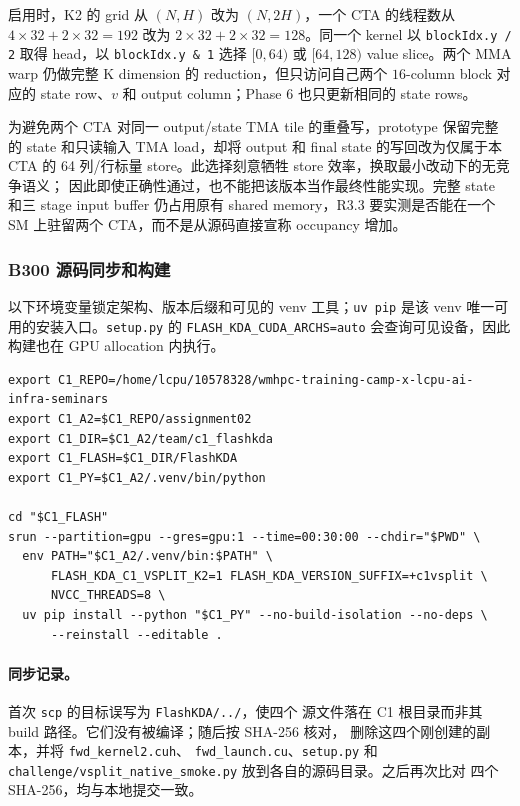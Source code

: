 \documentclass[11pt,a4paper,fontset=none]{ctexart}
\newcommand{\code}[1]{\texttt{#1}}
\begin{document}
启用时，K2 的 grid 从 \((N,H)\) 改为 \((N,2H)\)，一个 CTA 的线程数从
\(4\times32+2\times32=192\) 改为 \(2\times32+2\times32=128\)。同一个 kernel
以 \code{blockIdx.y / 2} 取得 head，以 \code{blockIdx.y \& 1} 选择
\([0,64)\) 或 \([64,128)\) value slice。两个 MMA warp 仍做完整 K dimension
的 reduction，但只访问自己两个 \(16\)-column block 对应的 state row、\(v\) 和
output column；Phase 6 也只更新相同的 state rows。

为避免两个 CTA 对同一 output/state TMA tile 的重叠写，prototype 保留完整的
state 和只读输入 TMA load，却将 output 和 final state 的写回改为仅属于本 CTA
的 64 列/行标量 store。此选择刻意牺牲 store 效率，换取最小改动下的无竞争语义；
因此即使正确性通过，也不能把该版本当作最终性能实现。完整 state 和三 stage
input buffer 仍占用原有 shared memory，R3.3 要实测是否能在一个 SM 上驻留两个
CTA，而不是从源码直接宣称 occupancy 增加。

\subsubsection{B300 源码同步和构建}

以下环境变量锁定架构、版本后缀和可见的 venv 工具；\code{uv pip} 是该 venv
唯一可用的安装入口。\code{setup.py} 的 \code{FLASH\_KDA\_CUDA\_ARCHS=auto}
会查询可见设备，因此构建也在 GPU allocation 内执行。

\begin{lstlisting}
export C1_REPO=/home/lcpu/10578328/wmhpc-training-camp-x-lcpu-ai-infra-seminars
export C1_A2=$C1_REPO/assignment02
export C1_DIR=$C1_A2/team/c1_flashkda
export C1_FLASH=$C1_DIR/FlashKDA
export C1_PY=$C1_A2/.venv/bin/python

cd "$C1_FLASH"
srun --partition=gpu --gres=gpu:1 --time=00:30:00 --chdir="$PWD" \
  env PATH="$C1_A2/.venv/bin:$PATH" \
      FLASH_KDA_C1_VSPLIT_K2=1 FLASH_KDA_VERSION_SUFFIX=+c1vsplit \
      NVCC_THREADS=8 \
  uv pip install --python "$C1_PY" --no-build-isolation --no-deps \
      --reinstall --editable .
\end{lstlisting}

\paragraph{同步记录。}首次 \code{scp} 的目标误写为 \code{FlashKDA/../}，使四个
源文件落在 C1 根目录而非其 build 路径。它们没有被编译；随后按 SHA-256 核对，
删除这四个刚创建的副本，并将 \code{fwd\_kernel2.cuh}、
\code{fwd\_launch.cu}、\code{setup.py} 和
\code{challenge/vsplit\_native\_smoke.py} 放到各自的源码目录。之后再次比对
四个 SHA-256，均与本地提交一致。
\end{document}
